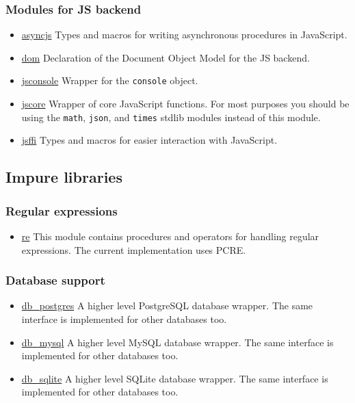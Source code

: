 \hypertarget{modules-for-js-backend}{%
\subsubsection{Modules for JS backend}\label{modules-for-js-backend}}

\begin{itemize}
\tightlist
\item
  \href{asyncjs.html}{asyncjs} Types and macros for writing asynchronous
  procedures in JavaScript.
\item
  \href{dom.html}{dom} Declaration of the Document Object Model for the
  JS backend.
\item
  \href{jsconsole.html}{jsconsole} Wrapper for the \texttt{console}
  object.
\item
  \href{jscore.html}{jscore} Wrapper of core JavaScript functions. For
  most purposes you should be using the \texttt{math}, \texttt{json},
  and \texttt{times} stdlib modules instead of this module.
\item
  \href{jsffi.html}{jsffi} Types and macros for easier interaction with
  JavaScript.
\end{itemize}

\hypertarget{impure-libraries}{%
\subsection{Impure libraries}\label{impure-libraries}}

\hypertarget{regular-expressions}{%
\subsubsection{Regular expressions}\label{regular-expressions}}

\begin{itemize}
\tightlist
\item
  \href{re.html}{re} This module contains procedures and operators for
  handling regular expressions. The current implementation uses PCRE.
\end{itemize}

\hypertarget{database-support}{%
\subsubsection{Database support}\label{database-support}}

\begin{itemize}
\tightlist
\item
  \href{db_postgres.html}{db\_postgres} A higher level PostgreSQL
  database wrapper. The same interface is implemented for other
  databases too.
\item
  \href{db_mysql.html}{db\_mysql} A higher level MySQL database wrapper.
  The same interface is implemented for other databases too.
\item
  \href{db_sqlite.html}{db\_sqlite} A higher level SQLite database
  wrapper. The same interface is implemented for other databases too.
\end{itemize}

